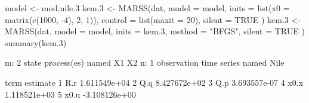 \begin{Schunk}
\begin{Sinput}
 model <- mod.nile.3
 kem.3 <- MARSS(dat,
   model = model, inits = list(x0 = matrix(c(1000, -4), 2, 1)),
   control = list(maxit = 20), silent = TRUE
 )
 kem.3 <- MARSS(dat,
   model = model, inits = kem.3,
   method = "BFGS", silent = TRUE
 )
 summary(kem.3)
\end{Sinput}
\begin{Soutput}
m: 2 state process(es) named X1 X2
n: 1 observation time series named Nile

  term      estimate
1  R.r  1.611549e+04
2  Q.q  8.427672e+02
3  Q.p  3.693557e-07
4 x0.x  1.118521e+03
5 x0.u -3.108126e+00
\end{Soutput}
\end{Schunk}
